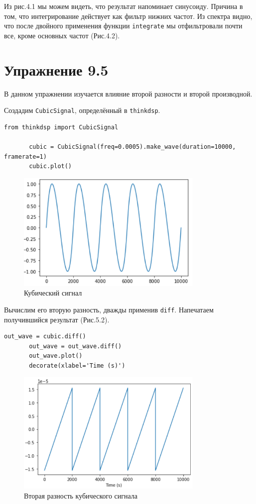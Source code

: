 \documentclass[a4paper,12pt]{report}
\begin{document}
    Из рис.4.1 мы можем видеть, что результат напоминает синусоиду. Причина в том, что интегрирование действует как фильтр нижних частот. Из спектра видно, что после двойного применения функции \texttt{integrate} мы отфильтровали почти все, кроме основных частот (Рис.4.2). 
    
\chapter{Упражнение 9.5}
    В данном упражнении изучается влияние второй разности и второй производной.
    
    Создадим \texttt{CubicSignal}, определённый в \texttt{thinkdsp}.
\begin{lstlisting}[caption=Создание кубического сигнала]
       from thinkdsp import CubicSignal

       cubic = CubicSignal(freq=0.0005).make_wave(duration=10000, framerate=1)
       cubic.plot()
\end{lstlisting}
\begin{figure}[H]
        \centering
        \includegraphics[width=0.8\textwidth]{fig5-1.PNG}
        \caption{Кубический сигнал}
        \label{fig:fig5-1}
\end{figure}     

    Вычислим его вторую разность, дважды применив \texttt{diff}. Напечатаем получившийся результат (Рис.5.2). 
\begin{lstlisting}[caption=Вычисление второй разности]
       out_wave = cubic.diff()
       out_wave = out_wave.diff()
       out_wave.plot()
       decorate(xlabel='Time (s)')
\end{lstlisting}
\begin{figure}[H]
        \centering
        \includegraphics[width=0.8\textwidth]{fig5-2.PNG}
        \caption{Вторая разность кубического сигнала}
        \label{fig:fig5-2}
\end{figure} 
    
\end{document}
